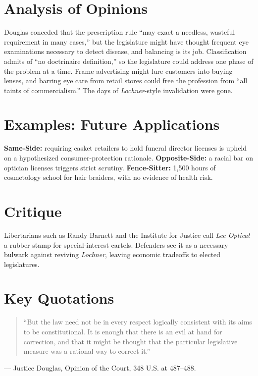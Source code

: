 \documentclass[12pt]{article}
\begin{document}
\section{Analysis of Opinions}
Douglas conceded that the prescription rule ``may exact a needless, wasteful requirement in many cases,'' but the legislature might have thought frequent eye examinations necessary to detect disease, and balancing is its job. Classification admits of ``no doctrinaire definition,'' so the legislature could address one phase of the problem at a time. Frame advertising might lure customers into buying lenses, and barring eye care from retail stores could free the profession from ``all taints of commercialism.'' The days of \textit{Lochner}-style invalidation were gone.

\section{Examples: Future Applications}
\textbf{Same-Side:} requiring casket retailers to hold funeral director licenses is upheld on a hypothesized consumer-protection rationale. \textbf{Opposite-Side:} a racial bar on optician licenses triggers strict scrutiny. \textbf{Fence-Sitter:} 1,500 hours of cosmetology school for hair braiders, with no evidence of health risk.

\section{Critique}
Libertarians such as Randy Barnett and the Institute for Justice call \textit{Lee Optical} a rubber stamp for special-interest cartels. Defenders see it as a necessary bulwark against reviving \textit{Lochner}, leaving economic tradeoffs to elected legislatures.

\section{Key Quotations}
\begin{quote}
``But the law need not be in every respect logically consistent with its aims to be constitutional. It is enough that there is an evil at hand for correction, and that it might be thought that the particular legislative measure was a rational way to correct it.''
\end{quote}
\noindent --- Justice Douglas, Opinion of the Court, 348 U.S. at 487--488.
\end{document}
